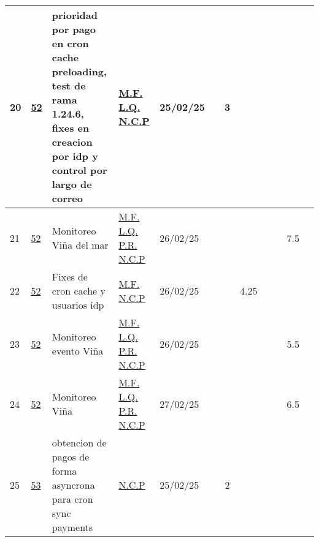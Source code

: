 \documentclass{article}
\begin{document}
\begin{longtable}{|m{0.3cm}|m{1cm}|p{3cm}|m{1.5cm}|m{1.3cm}||c|c|c|c|c|c|c| |}
                 \label{20}20  &  \hyperref[52]{\color{blue}52}  & prioridad por pago en cron cache preloading, test de rama 1.24.6, fixes en creacion por idp y control por largo de correo &  
                  \hyperref[M.F.]{\color{blue}M.F.} \newline  \hyperref[L.Q.]{\color{blue}L.Q.} \newline  \hyperref[N.C.P]{\color{blue}N.C.P}  & 25/02/25   &  & 3 &  &  &  &  & \\ \hline 

                 \label{21}21  &  \hyperref[52]{\color{blue}52}  & Monitoreo Viña del mar &  
                  \hyperref[M.F.]{\color{blue}M.F.} \newline  \hyperref[L.Q.]{\color{blue}L.Q.} \newline  \hyperref[P.R.]{\color{blue}P.R.} \newline  \hyperref[N.C.P]{\color{blue}N.C.P}  & 26/02/25   &  &  &  &  &  & 7.5 & \\ \hline 

                 \label{22}22  &  \hyperref[52]{\color{blue}52}  & Fixes de cron cache y usuarios idp &  
                  \hyperref[M.F.]{\color{blue}M.F.} \newline  \hyperref[N.C.P]{\color{blue}N.C.P}  & 26/02/25   &  &  & 4.25 &  &  &  & \\ \hline 

                 \label{23}23  &  \hyperref[52]{\color{blue}52}  & Monitoreo evento Viña &  
                  \hyperref[M.F.]{\color{blue}M.F.} \newline  \hyperref[L.Q.]{\color{blue}L.Q.} \newline  \hyperref[P.R.]{\color{blue}P.R.} \newline  \hyperref[N.C.P]{\color{blue}N.C.P}  & 26/02/25   &  &  &  &  &  & 5.5 & \\ \hline 

                 \label{24}24  &  \hyperref[52]{\color{blue}52}  & Monitoreo Viña &  
                  \hyperref[M.F.]{\color{blue}M.F.} \newline  \hyperref[L.Q.]{\color{blue}L.Q.} \newline  \hyperref[P.R.]{\color{blue}P.R.} \newline  \hyperref[N.C.P]{\color{blue}N.C.P}  & 27/02/25   &  &  &  &  &  & 6.5 & \\ \hline 

                 \label{25}25  &  \hyperref[53]{\color{blue}53}  & obtencion de pagos de forma asyncrona para cron sync payments &  
                  \hyperref[N.C.P]{\color{blue}N.C.P}  & 25/02/25   &  & 2 &  &  &  &  & \\ \hline 

    \end{longtable} 
 \newpage
\end{document}
